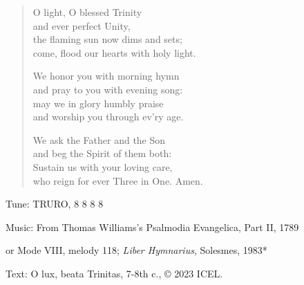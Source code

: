 \hymn

\begin{verse}
O light, O blessed Trinity\\
and ever perfect Unity,\\
the flaming sun now dims and sets;\\
come, flood our hearts with holy light.

We honor you with morning hymn\\
and pray to you with evening song:\\
may we in glory humbly praise\\
and worship you through ev’ry age.

We ask the Father and the Son\\
and beg the Spirit of them both:\\
Sustain us with your loving care,\\
who reign for ever Three in One. Amen.
\end{verse}

\begin{hymnsource}
Tune: TRURO, 8 8 8 8

Music: From Thomas Williams’s Psalmodia Evangelica, Part II, 1789

or Mode VIII, melody 118; \emph{Liber Hymnarius}, Solesmes, 1983*

Text: O lux, beata Trinitas, 7-8th c., © 2023 ICEL.
\end{hymnsource}